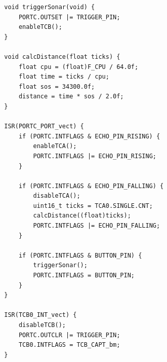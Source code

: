 \documentclass[11pt,a4paper,titlepage]{report}
\begin{document}
\begin{lstlisting}
		void triggerSonar(void) {
			PORTC.OUTSET |= TRIGGER_PIN;
			enableTCB();
		}
		
		void calcDistance(float ticks) {
			float cpu = (float)F_CPU / 64.0f;
			float time = ticks / cpu;
			float sos = 34300.0f;
			distance = time * sos / 2.0f;
		}
		
		ISR(PORTC_PORT_vect) {
			if (PORTC.INTFLAGS & ECHO_PIN_RISING) {
				enableTCA();
				PORTC.INTFLAGS |= ECHO_PIN_RISING;
			}
			
			if (PORTC.INTFLAGS & ECHO_PIN_FALLING) {
				disableTCA();
				uint16_t ticks = TCA0.SINGLE.CNT;
				calcDistance((float)ticks);
				PORTC.INTFLAGS |= ECHO_PIN_FALLING;
			}
			
			if (PORTC.INTFLAGS & BUTTON_PIN) {
				triggerSonar();
				PORTC.INTFLAGS = BUTTON_PIN;
			}
		}
		
		ISR(TCB0_INT_vect) {
			disableTCB();
			PORTC.OUTCLR |= TRIGGER_PIN;
			TCB0.INTFLAGS = TCB_CAPT_bm;
		}
	\end{lstlisting}
	
\end{document}
